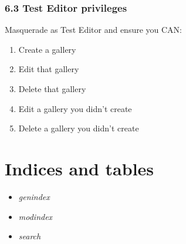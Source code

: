 \documentclass[letterpaper,10pt,english]{sphinxmanual}
\begin{document}
\subsection{6.3 Test Editor privileges}
\label{recipe:test-editor-privileges}
Masquerade as Test Editor and ensure you CAN:
\begin{enumerate}
\item {} 
Create a gallery

\item {} 
Edit that gallery

\item {} 
Delete that gallery

\item {} 
Edit a gallery you didn’t create

\item {} 
Delete a gallery you didn’t create

\end{enumerate}


\chapter{Indices and tables}
\label{index:indices-and-tables}\begin{itemize}
\item {} 
\emph{genindex}

\item {} 
\emph{modindex}

\item {} 
\emph{search}

\end{itemize}



\renewcommand{\indexname}{Index}
\printindex
\end{document}
